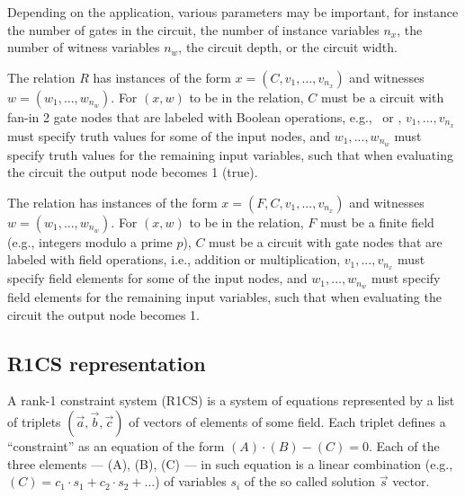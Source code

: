 Depending on the application, various parameters may be important, for instance the number of gates in the circuit, the number of instance variables $n_x$, the number of witness variables $n_w$, the circuit depth, or the circuit width.
 
The relation $R$ has instances of the form $x = (C, v_1, \ldots, v_{n_x})$ and witnesses $w = (w_1,...,w_{n_w})$. 
For $(x,w)$ to be in the relation, $C$ must be a circuit with fan-in 2 gate nodes that are labeled with Boolean operations, e.g., \XOR\ or \AND, $v_1,...,v_{n_x}$ must specify truth values for some of the input nodes, and $w_1,...,w_{n_w}$ must specify truth values for the remaining input variables, such that when evaluating the circuit the output node becomes 1 (true).
 
The relation has instances of the form $x = (F, C, v_1,...,v_{n_x})$ and witnesses $w = (w_1,...,w_{n_w})$.
For $(x,w)$ to be in the relation, $F$ must be a finite field (e.g., integers modulo a prime $p$), $C$ must be a circuit with gate nodes that are labeled with field operations, i.e., addition or multiplication, $v_1,...,v_{n_x}$ must specify field elements for some of the input nodes, and $w_1,...,w_{n_w}$ must specify field elements for the remaining input variables, such that when evaluating the circuit the output node becomes 1.
 

\subsection{R1CS representation}
\label{security:spec-statements-ZK:R1CS-representation}

\newcommand{\brkt}[1]{\ensuremath{\left\langle #1\right\rangle}}

A rank-1 constraint system (R1CS) is a system of equations represented by a list of triplets $(\vec{a}, \vec{b}, \vec{c})$ of vectors of elements of some field.
Each triplet defines a ``constraint'' as an equation of the form $(A) \cdot (B) - (C) = 0$.
Each of the three elements --- (A), (B), (C) --- in such equation is a linear combination (e.g., $(C) = c_1 \cdot s_1 + c_2 \cdot s_2 + ...$) of variables $s_i$ of the so called solution $\vec{s}$ vector.


